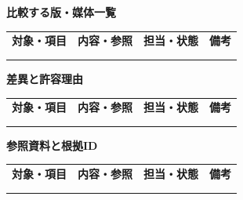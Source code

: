 \documentclass[11pt,a4paper]{article}
\begin{document}
\par{}\noindent\textbf{比較する版・媒体一覧}\par\vspace{1mm}
{\fontsize{8.5}{13}\selectfont
\begin{tabularx}{\linewidth}{@{}XXXX@{}}
\textbf{対象・項目} & \textbf{内容・参照} & \textbf{担当・状態} & \textbf{備考}\\[2mm]
\strut & \strut & \strut & \strut\\[5mm]
\strut & \strut & \strut & \strut\\[5mm]
\end{tabularx}
}\vspace{2mm}\par
{}
\par{}\noindent\textbf{差異と許容理由}\par\vspace{1mm}
{\fontsize{8.5}{13}\selectfont
\begin{tabularx}{\linewidth}{@{}XXXX@{}}
\textbf{対象・項目} & \textbf{内容・参照} & \textbf{担当・状態} & \textbf{備考}\\[2mm]
\strut & \strut & \strut & \strut\\[5mm]
\strut & \strut & \strut & \strut\\[5mm]
\end{tabularx}
}\vspace{2mm}\par
{}
\par{}\noindent\textbf{参照資料と根拠ID}\par\vspace{1mm}
{\fontsize{8.5}{13}\selectfont
\begin{tabularx}{\linewidth}{@{}XXXX@{}}
\textbf{対象・項目} & \textbf{内容・参照} & \textbf{担当・状態} & \textbf{備考}\\[2mm]
\strut & \strut & \strut & \strut\\[5mm]
\strut & \strut & \strut & \strut\\[5mm]
\end{tabularx}
}\vspace{2mm}\par
\end{document}
